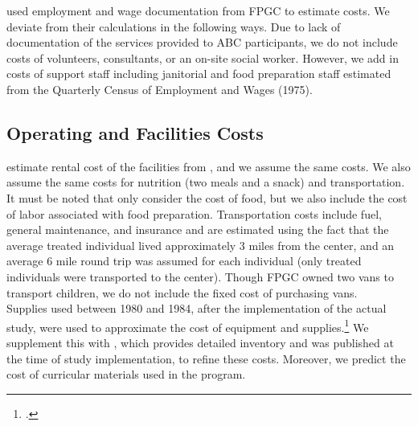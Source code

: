 \noindent \cite{Barnett_Masse_2002_benefitcost} used employment and wage documentation from FPGC to estimate costs. We deviate from their calculations in the following ways. Due to lack of documentation of the services provided to ABC participants, we do not include costs of volunteers, consultants, or an on-site social worker. However, we add in costs of support staff including janitorial and food preparation staff estimated from the Quarterly Census of Employment and Wages (1975). \\

\subsection{Operating and Facilities Costs}

\noindent \cite{Barnett_Masse_2002_benefitcost} estimate rental cost of the facilities from \cite{Helburn_1995_Childcare-Report}, and we assume the same costs. We also assume the same costs for nutrition (two meals and a snack) and transportation. It must be noted that \cite{Barnett_Masse_2002_benefitcost} only consider the cost of food, but we also include the cost of labor associated with food preparation. Transportation costs include fuel, general maintenance, and insurance and are estimated using the fact that the average treated individual lived approximately 3 miles from the center, and an average 6 mile round trip was assumed for each individual (only treated individuals were transported to the center). Though FPGC owned two vans to transport children, we do not include the fixed cost of purchasing vans. \\

\noindent Supplies used between 1980 and 1984, after the implementation of the actual study, were used to approximate the cost of equipment and supplies.\footnote{\citet{Barnett_Masse_2002_benefitcost}.} We supplement this with \cite{FPGC_Progress-Report_1973}, which provides detailed inventory and was published at the time of study  implementation, to refine these costs. Moreover, we predict the cost of curricular materials used in the program. \\


